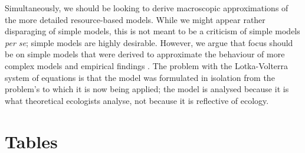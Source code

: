 \documentclass[a4paper,11pt]{article}
\begin{document}
Simultaneously, we should be looking to derive macroscopic
approximations of the more detailed resource-based models.  While we
might appear rather disparaging of simple models, this is not meant
to be a criticism of simple models \textit{per se}; simple models are
highly desirable.  However, we argue that focus should be on simple models
that were derived to approximate the behaviour of more complex models and
empirical findings \citep[e.g.][]{Champagnat-2006}.
The problem with the Lotka-Volterra system of equations is that the
model was formulated in isolation from the problem's to which it is
now being applied; the model is analysed because it is what
theoretical ecologists analyse, not because it is reflective of
ecology.

\clearpage

\section{Tables}
\end{document}
